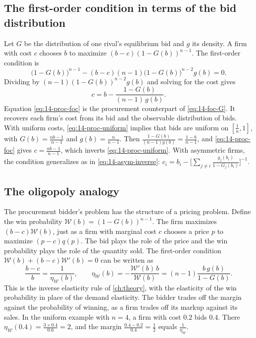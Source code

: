 \subsection{The first-order condition in terms of the bid distribution}\label{sec:14-proc-foc}

Let $G$ be the distribution of one rival's equilibrium bid and $g$ its density. A firm with cost $c$
chooses $b$ to maximize $(b-c)(1-G(b))^{n-1}$. The first-order condition is
\[
\bigl(1-G(b)\bigr)^{n-1}-(b-c)(n-1)\bigl(1-G(b)\bigr)^{n-2}g(b)=0 .
\]
Dividing by $(n-1)(1-G(b))^{n-2}g(b)$ and solving for the cost gives
\begin{equation}\label{eq:14-proc-foc}
c=b-\frac{1-G(b)}{(n-1)\,g(b)} .
\end{equation}
Equation \eqref{eq:14-proc-foc} is the procurement counterpart of \eqref{eq:14-foc-G}. It recovers
each firm's cost from its bid and the observable distribution of bids. With uniform costs,
\eqref{eq:14-proc-uniform} implies that bids are uniform on $[\frac{1}{n},1]$, with
$G(b)=\frac{nb-1}{n-1}$ and $g(b)=\frac{n}{n-1}$. Then $\frac{1-G(b)}{(n-1)g(b)}=\frac{1-b}{n-1}$, and
\eqref{eq:14-proc-foc} gives $c=\frac{nb-1}{n-1}$, which inverts \eqref{eq:14-proc-uniform}. With
asymmetric firms, the condition generalizes as in \eqref{eq:14-asym-inverse}:
$c_i=b_i-\bigl[\sum_{j\neq i}\frac{g_j(b_i)}{1-G_j(b_i)}\bigr]^{-1}$.

\subsection{The oligopoly analogy}\label{sec:14-proc-lerner}

The procurement bidder's problem has the structure of a pricing problem. Define the win probability
$\mathcal W(b)=(1-G(b))^{n-1}$. The firm maximizes $(b-c)\mathcal W(b)$, just as a firm with marginal cost $c$ chooses
a price $p$ to maximize $(p-c)q(p)$. The bid plays the role of the price and the win probability
plays the role of the quantity sold. The first-order condition $\mathcal W(b)+(b-c)\mathcal W'(b)=0$ can be written as
\begin{equation}\label{eq:14-proc-lerner}
\frac{b-c}{b}=\frac{1}{\eta_{\mathcal W}(b)},\qquad \eta_{\mathcal W}(b)=-\frac{\mathcal W'(b)\,b}{\mathcal W(b)}=(n-1)\frac{b\,g(b)}{1-G(b)} .
\end{equation}
This is the inverse elasticity rule of \cref{ch:theory}, with the elasticity of the win probability
in place of the demand elasticity. The bidder trades off the margin against the probability of
winning, as a firm trades off its markup against its sales. In the uniform example with $n=4$, a firm
with cost $0.2$ bids $0.4$. There $\eta_{\mathcal W}(0.4)=\frac{3\times 0.4}{0.6}=2$, and the margin
$\frac{0.4-0.2}{0.4}=\frac{1}{2}$ equals $\frac{1}{\eta_{\mathcal W}}$.


